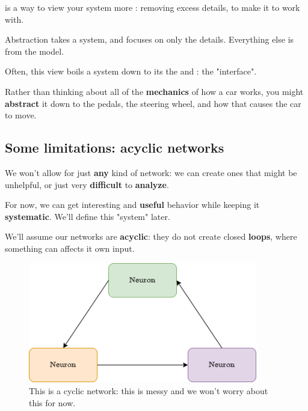         \begin{definition}
             is a way to view your system more : removing excess details, to make it  to work with.
            
            Abstraction takes a  system, and focuses on only the  details. Everything else is  from the model.
            
            Often, this  view boils a system down to its the  and : the "interface".
        \end{definition}
        
        \miniex Rather than thinking about all of the \textbf{mechanics} of how a car works, you might \textbf{abstract} it down to the pedals, the steering wheel, and how that causes the car to move.
    
    \subsection{Some limitations: acyclic networks}
    
        We won't allow for just \textbf{any} kind of network: we can create ones that might be unhelpful, or just very \textbf{difficult} to \textbf{analyze}. 
        
        For now, we can get interesting and \textbf{useful} behavior while keeping it \textbf{systematic}. We'll define this "system" later.
    
        We'll assume our networks are \textbf{acyclic}: they do not create closed \textbf{loops}, where something can affects it own input.
        
        \begin{figure}[H]
            \centering
            \includegraphics[width=100mm,scale=0.4]{images/nn_images/cyclic_network.png}
            \caption*{This is a cyclic network: this is messy and we won't worry about this for now.}
        \end{figure}
        

